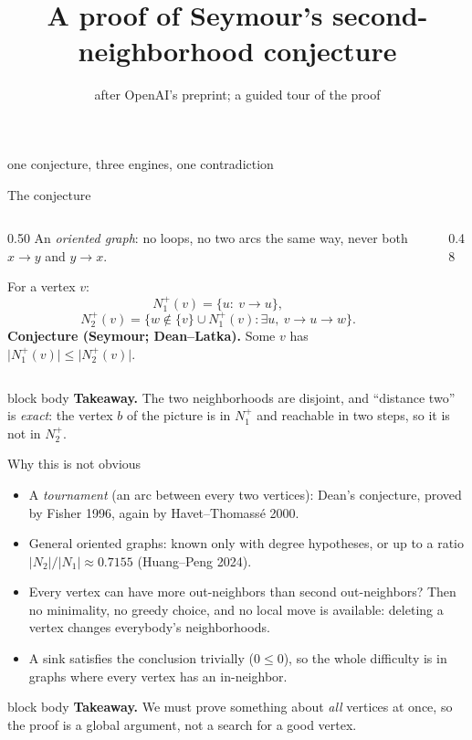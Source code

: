 \documentclass[aspectratio=169,11pt]{beamer}
\title[Seymour's second-neighborhood conjecture]{A proof of Seymour's second-neighborhood conjecture}
\subtitle{after OpenAI's preprint; a guided tour of the proof}
\author{}
\date{}
\newcommand{\abs}[1]{\lvert #1\rvert}
\newcommand{\takeaway}[1]{%
  \vfill
  \begin{beamercolorbox}[wd=\dimexpr\textwidth-9pt\relax,sep=4pt,rounded=true]{block body}
    \footnotesize\color{mainblue}\textbf{Takeaway.} \color{black}#1
  \end{beamercolorbox}}
\begin{document}
\begin{frame}
  \titlepage
  \begin{center}\footnotesize\color{black!60}
    one conjecture, three engines, one contradiction
  \end{center}
\end{frame}

\begin{frame}{The conjecture}
  \begin{columns}[T]
  \begin{column}{0.50\textwidth}
    \small
    An \emph{oriented graph}: no loops, no two arcs the same way, never both $x\to y$ and $y\to x$.
    \medskip

    For a vertex $v$:
    \[
      N_1^+(v)=\{u:\ v\to u\},
    \]
    \[
      N_2^+(v)=\bigl\{w\notin\{v\}\cup N_1^+(v): \exists u,\ v\to u\to w\bigr\}.
    \]
    \medskip
    \textbf{Conjecture (Seymour; Dean--Latka).} Some $v$ has
    $\abs{N_1^+(v)}\le\abs{N_2^+(v)}$.
  \end{column}
  \begin{column}{0.48\textwidth}
    \centering
    \scalebox{0.78}{}
  \end{column}
  \end{columns}
  \takeaway{The two neighborhoods are disjoint, and ``distance two'' is \emph{exact}:
  the vertex $b$ of the picture is in $N_1^+$ and reachable in two steps, so it is not in $N_2^+$.}
\end{frame}

\begin{frame}{Why this is not obvious}
  \small
  \begin{itemize}
    \item A \emph{tournament} (an arc between every two vertices): Dean's conjecture, proved by
      Fisher 1996, again by Havet--Thomass\'e 2000.
    \item General oriented graphs: known only with degree hypotheses, or up to a ratio
      $\abs{N_2}/\abs{N_1}\approx0.7155$ (Huang--Peng 2024).
    \item Every vertex can have more out-neighbors than second out-neighbors? Then no
      minimality, no greedy choice, and no local move is available: deleting a vertex changes
      everybody's neighborhoods.
    \item A sink satisfies the conclusion trivially ($0\le0$), so the whole difficulty is in
      graphs where every vertex has an in-neighbor.
  \end{itemize}
  \takeaway{We must prove something about \emph{all} vertices at once, so the proof is a global
  argument, not a search for a good vertex.}
\end{frame}
\end{document}
